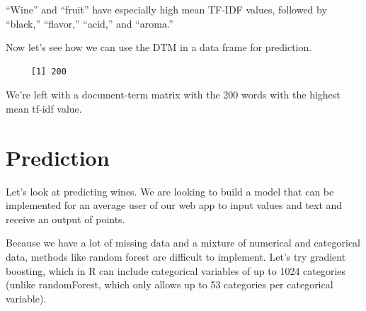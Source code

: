 \documentclass[12pt,twoside]{amherstthesis}
\newenvironment{Shaded}{\begin{snugshade}}{\end{snugshade}}
\newcommand{\KeywordTok}[1]{\textcolor[rgb]{0.13,0.29,0.53}{\textbf{#1}}}
\newcommand{\StringTok}[1]{\textcolor[rgb]{0.31,0.60,0.02}{#1}}
\newcommand{\CommentTok}[1]{\textcolor[rgb]{0.56,0.35,0.01}{\textit{#1}}}
\newcommand{\OperatorTok}[1]{\textcolor[rgb]{0.81,0.36,0.00}{\textbf{#1}}}
\newcommand{\NormalTok}[1]{#1}
\begin{document}
``Wine'' and ``fruit'' have especially high mean TF-IDF values, followed
by ``black,'' ``flavor,'' ``acid,'' and ``aroma.''

Now let's see how we can use the DTM in a data frame for prediction.
\begin{Shaded}
\end{Shaded}
\begin{verbatim}
     [1] 200
\end{verbatim}
We're left with a document-term matrix with the 200 words with the
highest mean tf-idf value.

\section{Prediction}\label{prediction}

Let's look at predicting wines. We are looking to build a model that can
be implemented for an average user of our web app to input values and
text and receive an output of points.

Because we have a lot of missing data and a mixture of numerical and
categorical data, methods like random forest are difficult to implement.
Let's try gradient boosting, which in R can include categorical
variables of up to 1024 categories (unlike randomForest, which only
allows up to 53 categories per categorical variable).
\end{document}

